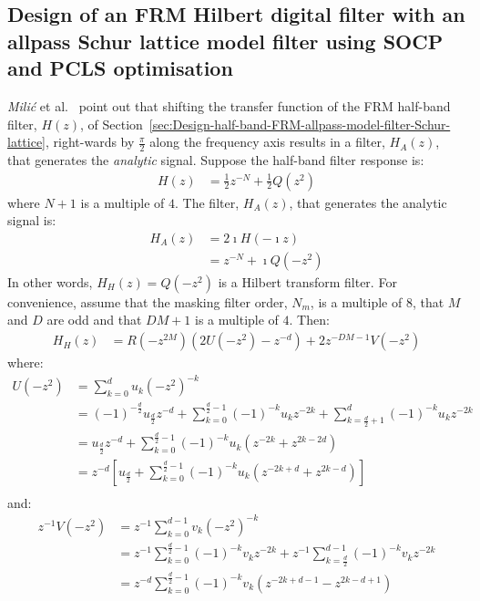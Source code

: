 \documentclass[a4paper,twoside,10pt,english]{report}
\begin{document}
\subsection{\label{sec:Design-Hilbert-FRM-allpass-model-filter-Schur-lattice}Design of an FRM Hilbert digital filter with an allpass Schur lattice model filter using SOCP and PCLS optimisation}
\emph{Mili\'{c}} et al.~\cite{Milic_FRMAllpassHilbert} point out that shifting
the transfer function of the FRM half-band filter, $H\left(z\right)$, of
Section~\ref{sec:Design-half-band-FRM-allpass-model-filter-Schur-lattice},
right-wards by $\frac{\pi}{2}$ along the frequency axis results in a filter,
$H_{A}\left(z\right)$, that generates the \emph{analytic} signal. Suppose the
half-band filter response is:
\begin{align*}
H\left(z\right)&=\frac{1}{2}z^{-N}+\frac{1}{2}Q\left(z^{2}\right)
\end{align*}
where $N+1$ is a multiple of $4$. The filter, $H_{A}\left(z\right)$,
that generates the analytic signal is:
\begin{align*}
H_{A}\left(z\right) &=2\imath H\left(-\imath z\right) \\
 &= z^{-N}+\imath Q\left(-z^{2}\right)
\end{align*}
In other words, $H_{H}\left(z\right)=Q\left(-z^{2}\right)$ is a Hilbert
transform filter. For convenience, assume that the masking filter order,
$N_{m}$, is a multiple of $8$, that $M$ and $D$ are odd and that $DM+1$ is a
multiple of $4$. Then:
\begin{align*}
H_{H}\left(z\right)&=R\left(-z^{2M}\right)
\left(2U\left(-z^{2}\right)-z^{-d}\right)+2z^{-DM-1}V\left(-z^{2}\right)
\end{align*}
where:
\begin{align*}
  U\left(-z^{2}\right)
  &=\sum_{k=0}^{d}u_{k}\left(-z^{2}\right)^{-k}\\
  &=\left(-1\right)^{-\frac{d}{2}}u_{\frac{d}{2}}z^{-d}+
    \sum_{k=0}^{\frac{d}{2}-1}\left(-1\right)^{-k}u_{k}z^{-2k}+
    \sum_{k=\frac{d}{2}+1}^{d}\left(-1\right)^{-k}u_{k}z^{-2k}\\
  &=u_{\frac{d}{2}}z^{-d}+
    \sum_{k=0}^{\frac{d}{2}-1}\left(-1\right)^{-k}u_{k}
    \left(z^{-2k}+z^{2k-2d}\right)\\
  &=z^{-d}\left[u_{\frac{d}{2}}+
    \sum_{k=0}^{\frac{d}{2}-1}\left(-1\right)^{-k}u_{k}
    \left(z^{-2k+d}+z^{2k-d}\right)\right]\\
\end{align*}
and:
\begin{align*}
  z^{-1}V\left(-z^{2}\right)
  &=z^{-1}\sum_{k=0}^{d-1}v_{k}\left(-z^{2}\right)^{-k}\\
  &=z^{-1}\sum_{k=0}^{\frac{d}{2}-1}\left(-1\right)^{-k}v_{k}z^{-2k}+
    z^{-1}\sum_{k=\frac{d}{2}}^{d-1}\left(-1\right)^{-k}v_{k}z^{-2k}\\
  &=z^{-d}\sum_{k=0}^{\frac{d}{2}-1}\left(-1\right)^{-k}v_{k}
    \left(z^{-2k+d-1}-z^{2k-d+1}\right)
\end{align*}
\end{document}
